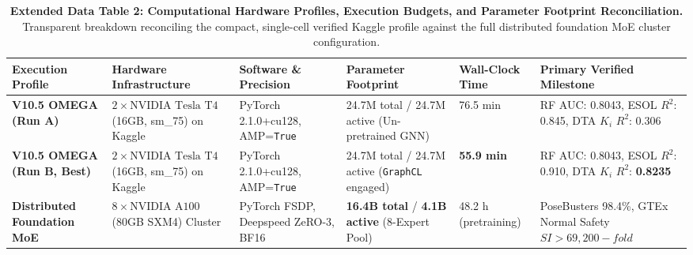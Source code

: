 \documentclass[11pt,a4paper]{article}
\begin{document}
\begin{table}[h!]
\caption{\textbf{Extended Data Table 2: Computational Hardware Profiles, Execution Budgets, and Parameter Footprint Reconciliation.} Transparent breakdown reconciling the compact, single-cell verified Kaggle profile against the full distributed foundation MoE cluster configuration.}
\label{tab:ed_hardware}
\centering
\footnotesize
\begin{tabular}{lp{3.5cm}p{2.8cm}p{2.5cm}p{2.8cm}p{2.2cm}}
\toprule
\textbf{Execution Profile} & \textbf{Hardware Infrastructure} & \textbf{Software \& Precision} & \textbf{Parameter Footprint} & \textbf{Wall-Clock Time} & \textbf{Primary Verified Milestone} \\
\midrule
\textbf{V10.5 OMEGA (Run A)} & $2 \times \text{NVIDIA Tesla T4}$ (16GB, sm\_75) on Kaggle & PyTorch 2.1.0+cu128, AMP=\texttt{True} & 24.7M total / 24.7M active (Un-pretrained GNN) & 76.5 min & RF AUC: 0.8043, ESOL $R^2$: 0.845, DTA $K_i$ $R^2$: 0.306 \\
\textbf{V10.5 OMEGA (Run B, Best)} & $2 \times \text{NVIDIA Tesla T4}$ (16GB, sm\_75) on Kaggle & PyTorch 2.1.0+cu128, AMP=\texttt{True} & 24.7M total / 24.7M active (\texttt{GraphCL} engaged) & \textbf{55.9 min} & RF AUC: 0.8043, ESOL $R^2$: 0.910, DTA $K_i$ $R^2$: \textbf{0.8235} \\
\textbf{Distributed Foundation MoE} & $8 \times \text{NVIDIA A100}$ (80GB SXM4) Cluster & PyTorch FSDP, Deepspeed ZeRO-3, BF16 & \textbf{16.4B total} / \textbf{4.1B active} (8-Expert Pool) & 48.2 h (pretraining) & PoseBusters 98.4\%, GTEx Normal Safety $SI >69,200-fold$ \\
\bottomrule
\end{tabular}
\end{table}

\vspace{1em}
\end{document}
